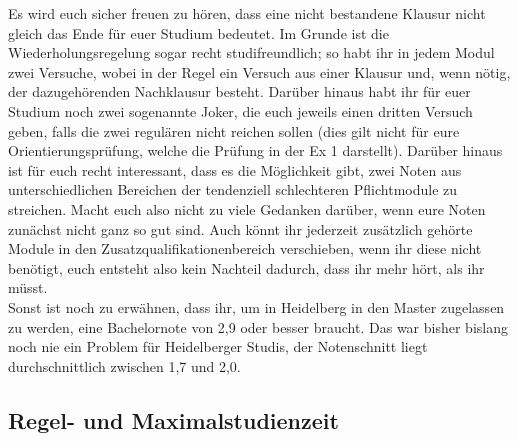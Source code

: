 Es wird euch sicher freuen zu hören, dass eine nicht bestandene Klausur nicht gleich das Ende für euer Studium bedeutet. Im Grunde ist die Wiederholungsregelung sogar recht studifreundlich; so habt ihr in jedem Modul zwei Versuche, wobei in der Regel ein Versuch aus einer Klausur und, wenn nötig, der dazugehörenden Nachklausur besteht. Darüber hinaus habt ihr für euer Studium noch zwei sogenannte Joker, die euch jeweils einen dritten Versuch geben, falls die zwei regulären nicht reichen sollen (dies gilt nicht für eure Orientierungsprüfung, welche die Prüfung in der Ex 1 darstellt). Darüber hinaus ist für euch recht interessant, dass es die Möglichkeit gibt, zwei Noten aus unterschiedlichen Bereichen der tendenziell schlechteren Pflichtmodule zu streichen. Macht euch also nicht zu viele Gedanken darüber, wenn eure Noten zunächst nicht ganz so gut sind. Auch könnt ihr jederzeit zusätzlich gehörte Module in den Zusatzqualifikationenbereich verschieben, wenn ihr diese nicht benötigt, euch entsteht also kein Nachteil dadurch, dass ihr mehr hört, als ihr müsst.\\

Sonst ist noch zu erwähnen, dass ihr, um in Heidelberg in den Master zugelassen zu werden, eine Bachelornote von 2,9 oder besser braucht. Das war bisher bislang noch nie ein Problem für Heidelberger Studis, der Notenschnitt liegt durchschnittlich zwischen 1,7 und 2,0.

\subsection{Regel- und Maximalstudienzeit}

